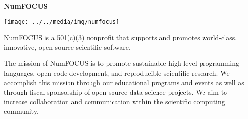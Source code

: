 \textbf{NumFOCUS}

\texttt{[image: ../../media/img/numfocus]}

NumFOCUS is a 501(c)(3) nonprofit that supports and promotes world-class,
innovative, open source scientific software.

The mission of NumFOCUS is to promote sustainable high-level programming
languages, open code development, and reproducible scientific research. We
accomplish this mission through our educational programs and events as well as
through fiscal sponsorship of open source data science projects. We aim to
increase collaboration and communication within the scientific computing
community.
